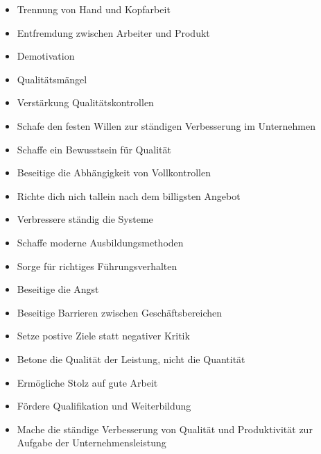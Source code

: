 \documentclass[12pt]{article}
\begin{document}
\begin{note}

    \begin{field}
        \begin{itemize}
            \item Trennung von Hand und Kopfarbeit
            \item Entfremdung zwischen Arbeiter und Produkt
            \item Demotivation
            \item Qualitätsmängel
            \item Verstärkung Qualitätskontrollen
        \end{itemize}
    \end{field}
\end{note}

\begin{note}

    \begin{field}
        \begin{itemize}
            \item Schafe den festen Willen zur ständigen Verbesserung im Unternehmen
            \item Schaffe ein Bewusstsein für Qualität
            \item Beseitige die Abhängigkeit von Vollkontrollen
            \item Richte dich nich tallein nach dem billigsten Angebot
            \item Verbressere ständig die Systeme
            \item Schaffe moderne Ausbildungsmethoden
            \item Sorge für richtiges Führungsverhalten
            \item Beseitige die Angst
            \item Beseitige Barrieren zwischen Geschäftsbereichen
            \item Setze postive Ziele statt negativer Kritik
            \item Betone die Qualität der Leistung, nicht die Quantität
            \item Ermögliche Stolz auf gute Arbeit
            \item Fördere Qualifikation und Weiterbildung
            \item Mache die ständige Verbesserung von Qualität und Produktivität zur Aufgabe der Unternehmensleistung
        \end{itemize}
    \end{field}
\end{note}
\end{document}

